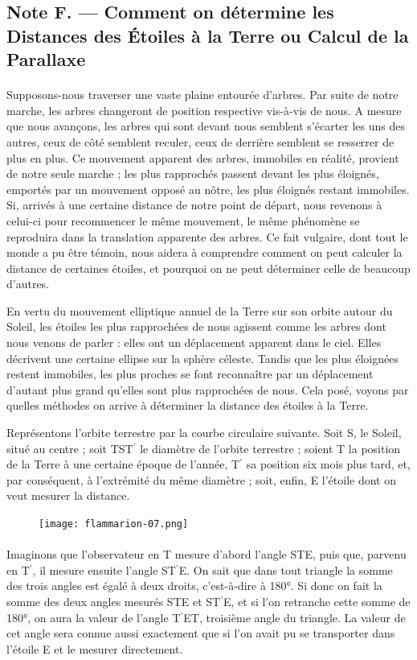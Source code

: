 \documentclass[a4paper, 11pt, oneside]{article}
\begin{document}
\subsection{Note F. --- Comment on détermine les Distances des Étoiles à la Terre ou Calcul de la Parallaxe}
\paragraph{}
Supposons-nous traverser une vaste plaine entourée d'arbres. Par suite de notre marche, les arbres changeront de position respective vis-à-vis de nous. A mesure que nous avançons, les arbres qui sont devant nous semblent s'écarter les uns des autres, ceux de côté semblent reculer, ceux de derrière semblent se resserrer de plus en plus. Ce mouvement apparent des arbres, immobiles en réalité, provient de notre seule marche ; les plus rapprochés passent devant les plus éloignés, emportés par un mouvement opposé au nôtre, les plus éloignés restant immobiles. Si, arrivés à une certaine distance de notre point de départ, nous revenons à celui-ci pour recommencer le même mouvement, le même phénomène se reproduira dans la translation apparente des arbres. Ce fait vulgaire, dont tout le monde a pu être témoin, nous aidera à comprendre comment on peut calculer la distance de certaines étoiles, et pourquoi on ne peut déterminer celle de beaucoup d'autres.

En vertu du mouvement elliptique annuel de la Terre sur son orbite autour du Soleil, les étoiles les plus rapprochées de nous agissent comme les arbres dont nous venons de parler : elles ont un déplacement apparent dans le ciel. Elles décrivent une certaine ellipse sur la sphère céleste. Tandis que les plus éloignées restent immobiles, les plus proches se font reconnaître par un déplacement d'autant plus grand qu'elles sont plus rapprochées de nous. Cela posé, voyons par quelles méthodes on arrive à déterminer la distance des étoiles à la Terre.

Représentons l'orbite terrestre par la courbe circulaire suivante. Soit S, le Soleil, situé au centre ; soit TST$^{\prime}$ le diamètre de l'orbite terrestre ; soient T la position de la Terre à une certaine époque de l'année, T$^{\prime}$ sa position six mois plus tard, et, par conséquent, à l'extrémité du même diamètre ; soit, enfin, E l'étoile dont on veut mesurer la distance.
\begin{figure}[H]
\centering
\texttt{[image: flammarion-07.png]}
\end{figure}
\paragraph{}
Imaginons que l'observateur en T mesure d'abord l'angle STE, puis que, parvenu en T$^{\prime}$, il mesure ensuite l'angle ST$^{\prime}$E. On sait que dans tout triangle la somme des trois angles est égalé à deux droits, c'est-à-dire à 180°. Si donc on fait la somme des deux angles mesurés STE et ST$^{\prime}$E, et si l'on retranche cette somme de 180°, on aura la valeur de l'angle T$^{\prime}$ET, troisième angle du triangle. La valeur de cet angle sera connue aussi exactement que si l'on avait pu se transporter dans l'étoile E et le mesurer directement.
\end{document}
